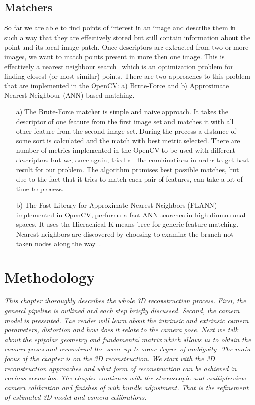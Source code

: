 \section{Matchers}
\label{sec:matchers}
So far we are able to find points of interest in an image and describe them in such a way that they are effectively stored but still contain information about the point and its local image patch. Once descriptors are extracted from two or more images, we want to match points present in more then one image. This is effectively a nearest neighbour search~\cite{nearest_neighbour_search} which is an optimization problem for finding closest (or most similar) points. There are two approaches to this problem that are implemented in the OpenCV: a) Brute-Force and b) Approximate Nearest Neighbour (ANN)-based matching.

\begin{itemize}
	\item[a)] The Brute-Force matcher is simple and naive approach. It takes the descriptor of one feature from the first image set and matches it with all other feature from the second image set. During the process a distance of some sort is calculated and the match with best metric selected. There are number of metrics implemented in the OpenCV to be used with different descriptors but we, once again, tried all the combinations in order to get best result for our problem. The algorithm promises best possible matches, but due to the fact that it tries to match each pair of features, can take a lot of time to process. 

	\item[b)] The Fast Library for Approximate Nearest Neighbors (FLANN) implemented in OpenCV, performs a fast ANN searches in high dimensional spaces. It uses the Hierachical K-means Tree for generic feature matching. Nearest neighbors are discovered by choosing to examine the branch-not-taken nodes along the way~\cite{www:flann}.
\end{itemize}

\chapter{Methodology}
\label{chapter:methodology}
\textit{This chapter thoroughly describes the whole 3D reconstruction process. First, the general pipeline is outlined and each step briefly discussed. Second, the camera model is presented. The reader will learn about the intrinsic and extrinsic camera parameters, distortion and how does it relate to the camera pose. Next we talk about the epipolar geometry and fundamental matrix which allows us to obtain the camera poses and reconstruct the scene up to some degree of ambiguity. The main focus of the chapter is on the 3D reconstruction. We start with the 3D reconstruction approaches and what form of reconstruction can be achieved in various scenarios. The chapter continues with the stereoscopic and multiple-view camera calibration and finishes of with bundle adjustment. That is the refinement of estimated 3D model and camera calibrations.}

